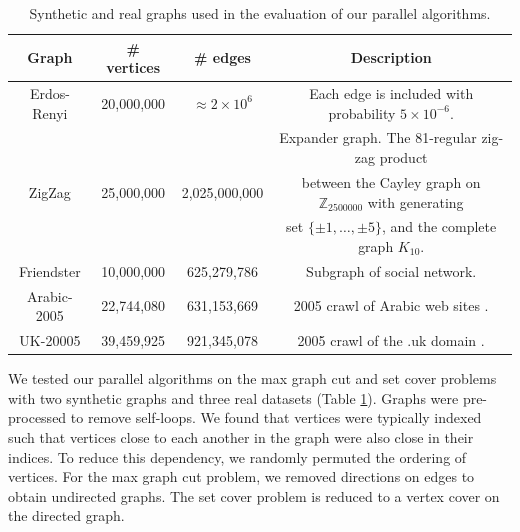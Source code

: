 \documentclass{article} %
\begin{document}
\begin{table}[h]
\centering\footnotesize
\begin{tabular}{|c|c|c|c|}\hline
Graph & \# vertices & \# edges & Description \\\hline\hline
Erdos-Renyi & 20,000,000 & $\approx 2 \times 10^6$ & Each edge is included with probability $5\times 10^{-6}$.\\\hline
\multirow{3}{*}{ZigZag}      & \multirow{3}{*}{25,000,000} &  \multirow{3}{*}{2,025,000,000} & Expander graph. The 81-regular zig-zag product \\
& & & between the Cayley graph on $\mathbb{Z}_{2500000}$ with generating \\
& & & set $\{\pm 1,\dots,\pm 5\}$, and the complete graph $K_{10}$.\\\hline
Friendster  & 10,000,000 &    625,279,786 & Subgraph of social network. \cite{snap}\\\hline
Arabic-2005 & 22,744,080 &    631,153,669 & 2005 crawl of Arabic web sites \cite{BoVWFI, BRSLLP, BCSU3}. \\\hline
UK-20005    & 39,459,925 &    921,345,078 & 2005 crawl of the .uk domain \cite{BoVWFI, BRSLLP, BCSU3}. \\\hline
\end{tabular}
\caption{\footnotesize Synthetic and real graphs used in the evaluation of our parallel algorithms.}
\label{tab:graphstats}
\end{table}



We tested our parallel algorithms on the max graph cut and set cover problems with two synthetic graphs and three real datasets (Table \ref{tab:graphstats}).
Graphs were pre-processed to remove self-loops.
We found that vertices were typically indexed such that vertices close to each another in the graph were also close in their indices.
To reduce this dependency, we randomly permuted the ordering of vertices.
For the max graph cut problem, we removed directions on edges to obtain undirected graphs.
The set cover problem is reduced to a vertex cover on the directed graph.
\end{document}
